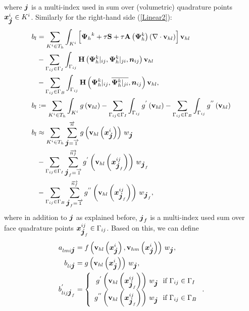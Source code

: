 where $\mbox{\boldmath $j$}$ is a multi-index used in sum over (volumetric) quadrature points $\mbox{\boldmath $x$}_{\mbox{\boldmath $j$}}^i \in K^i$.
Similarly for the right-hand side (\cref{Linear2}):
\begin{align}
b_{l} & =  \sum_{K^i \in T_h}\int_{K^i} \left[{\mathrm{\mathbf{\Psi}}_h}^{k} + \tau\mathrm{\mathbf{S}} + \tau\mathrm{\mathbf{A}}\left({\mathrm{\mathbf{\Psi}}_h^{k}}\right) \left(\nabla \cdot \mathrm{\mathbf{v}}_{hl}\right)\right] \mathrm{\mathbf{v}}_{hl}\\
\nonumber & - \sum_{\Gamma_{ij}\in\Gamma_I} \int_{\Gamma_{ij}}\mathrm{\mathbf{H}}\left({\mathrm{\mathbf{\Psi}}_h^{k}}|_{ij}, {\mathrm{\mathbf{\Psi}}_h^{k}}|_{ji}, \mbox{\boldmath $n$}_{ij}\right) \mathrm{\mathbf{v}}_{hl}\\
\nonumber& - \sum_{\Gamma_{ij}\in\Gamma_B} \int_{\Gamma_{ij}} \mathrm{\mathbf{H}}\left({\mathrm{\mathbf{\Psi}}_h^{k}}|_{ij}, \overline{{\mathrm{\mathbf{\Psi}}_h^{k}}|_{ji}}, \mbox{\boldmath $n$}_{ij}\right) \mathrm{\mathbf{v}}_{hl},\\
\label{Final_Integration_Fn_b}   b_{l} & := \sum_{K^i \in T_h}\int_{K^i} g\left(\mathrm{\mathbf{v}}_{hl}\right) - \sum_{\Gamma_{ij}\in\Gamma_I} \int_{\Gamma_{ij}}g^{'}\left(\mathrm{\mathbf{v}}_{hl}\right) - \sum_{\Gamma_{ij}\in\Gamma_B} \int_{\Gamma_{ij}} g^{''}\left(\mathrm{\mathbf{v}}_{hl}\right) \\
b_{l} & \approx \sum_{K^i \in T_h} \sum_{\mbox{\boldmath $j$}=\overrightarrow{1}}^{\overrightarrow{n}} g\left(\mathrm{\mathbf{v}}_{hl}\left(\mbox{\boldmath $x$}_{\mbox{\boldmath $j$}}^i\right)\right)\,w_{\mbox{\boldmath $j$}}\\
\nonumber & -  \sum_{\Gamma_{ij}\in\Gamma_I} \sum_{\mbox{\boldmath $j$}_f=\overrightarrow{1}}^{\overrightarrow{n_f}} g^{'}\left(\mathrm{\mathbf{v}}_{hl}\left(\mbox{\boldmath $x$}^{ij}_{\mbox{\boldmath $j$}_{f}}\right)\right)\,w_{\mbox{\boldmath $j$}_{f}}\\
\nonumber & -  \sum_{\Gamma_{ij}\in\Gamma_B} \sum_{\mbox{\boldmath $j$}_{f}=\overrightarrow{1}}^{\overrightarrow{n_f}} g^{''}\left(\mathrm{\mathbf{v}}_{hl}\left(\mbox{\boldmath $x$}^{ij}_{\mbox{\boldmath $j$}_{f}}\right)\right)\,w_{\mbox{\boldmath $j$}_{f}},
\end{align}
where in addition to $\mbox{\boldmath $j$}$ as explained before, $\mbox{\boldmath $j$}_{f}$ is a multi-index used sum over face quadrature points $\mbox{\boldmath $x$}_{\mbox{\boldmath $j$}_f}^{ij} \in \Gamma_{ij}$. Based on this, we can define
\begin{align}
	\label{singleNumIntA}   a_{lmi \bfj} & =  f\lo\mrvhl\lo\bfx^i_{\bfj}\ro, \mrvhm\lo\bfx^i_{\bfj}\ro\ro\,w_{\bfj},\\
	\label{singleNumIntB}   b_{li \bfj} & =  g\lo\mrvhl\lo\bfx^i_{\bfj}\ro\ro\,w_{\bfj},\\
	\label{singleNumIntBface}  b^{'}_{lij \bfj_f} & =  \left\{\begin{array}{c} g^{'}\lo\mrvhl\lo\bfx^{ij}_{\bfj_f}\ro\ro\,w_{\bfj}\ \ \text{if}\ \Gamma_{ij}\in \Gamma_I \\ g^{''}\lo\mrvhl\lo\bfx^{ij}_{\bfj_f}\ro\ro\,w_{\bfj}\ \ \text{if}\ \Gamma_{ij}\in \Gamma_B \end{array}\right. .
\end{align}

